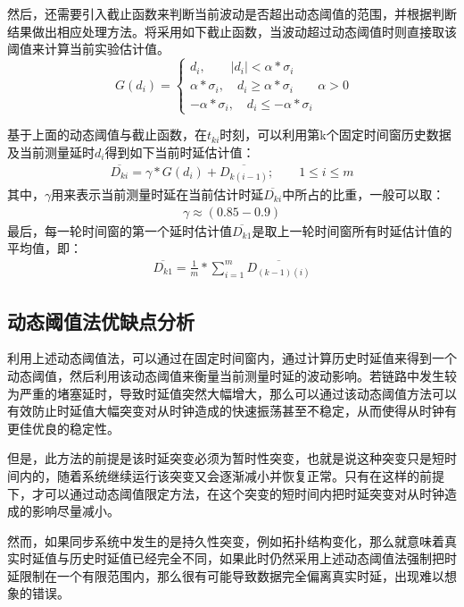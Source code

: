然后，还需要引入截止函数来判断当前波动是否超出动态阈值的范围，并根据判断结果做出相应处理方法。将采用如下截止函数，当波动超过动态阈值时则直接取该阈值来计算当前实验估计值。
\begin{equation}
G(d_{i}) = \left\{
	\begin{array}{lll} %
		d_{i}, \qquad \left | d_{i} \right | < \alpha * \sigma_{i} \\
		\alpha * \sigma_{i}, \quad d_{i} \geq \alpha * \sigma_{i} \\
		-\alpha * \sigma_{i}, \quad d_{i} \leq -\alpha * \sigma_{i}
	\end{array}
	\alpha > 0 \right. 
\end{equation}

基于上面的动态阈值与截止函数，在$t_{ki}$时刻，可以利用第k个固定时间窗历史数据及当前测量延时$d_{i}$得到如下当前时延估计值：
\begin{align}
\overline{D_{ki}} = \gamma * G(d_{i}) + \overline{D_{k(i-1)}}; \qquad 1\leq i \leq m
\end{align}
其中，$\gamma$用来表示当前测量时延在当前估计时延$\overline{D_{ki}}$中所占的比重，一般可以取：
\begin{align}
\gamma \approx (0.85-0.9)
\end{align}
最后，每一轮时间窗的第一个延时估计值$\overline{D_{k1}}$是取上一轮时间窗所有时延估计值的平均值，即：
\begin{align}
\overline{D_{k1}} = \frac{1}{m} * \sum_{i=1}^{m}\overline{D_{(k-1)(i)}}
\end{align}

\subsection{动态阈值法优缺点分析}
利用上述动态阈值法，可以通过在固定时间窗内，通过计算历史时延值来得到一个动态阈值，然后利用该动态阈值来衡量当前测量时延的波动影响。若链路中发生较为严重的堵塞延时，导致时延值突然大幅增大，那么可以通过该动态阈值方法可以有效防止时延值大幅突变对从时钟造成的快速振荡甚至不稳定，从而使得从时钟有更佳优良的稳定性。

但是，此方法的前提是该时延突变必须为暂时性突变，也就是说这种突变只是短时间内的，随着系统继续运行该突变又会逐渐减小并恢复正常。只有在这样的前提下，才可以通过动态阈值限定方法，在这个突变的短时间内把时延突变对从时钟造成的影响尽量减小。

然而，如果同步系统中发生的是持久性突变，例如拓扑结构变化，那么就意味着真实时延值与历史时延值已经完全不同，如果此时仍然采用上述动态阈值法强制把时延限制在一个有限范围内，那么很有可能导致数据完全偏离真实时延，出现难以想象的错误。

